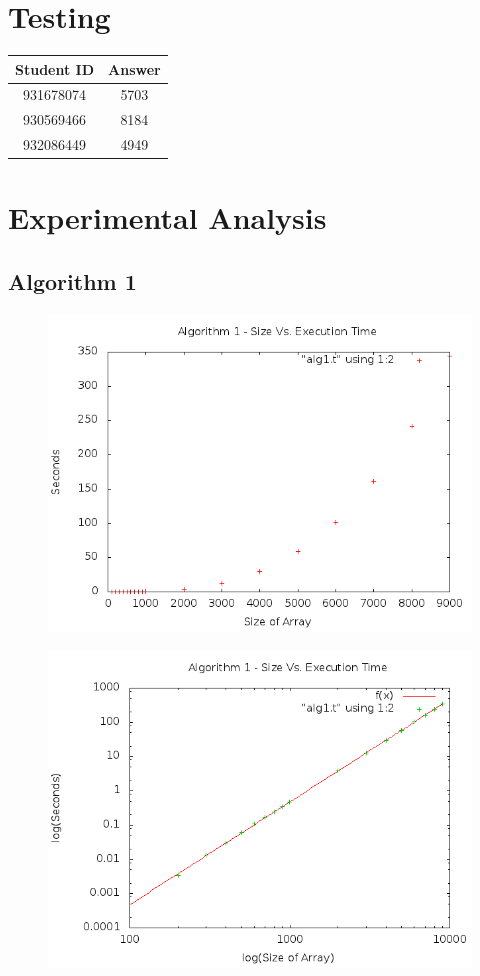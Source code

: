 \documentclass[a4paper,10pt]{article}
\begin{document}
	\section{Testing}

		\begin{tabular}{ | c | c | }
		\hline
		Student ID & Answer\\ \hline
		931678074 & 5703 \\
		930569466 & 8184 \\
		932086449 & 4949 \\
		\hline
		\end{tabular}

	\newpage
	\section{Experimental Analysis}

		\subsection{Algorithm 1}
			\begin{figure}[!htb]
				\centering
				\includegraphics[scale=.5]{timingfiles/alg1plot.png}
			\end{figure}
			\begin{figure}[!htb]
				\centering
				\includegraphics[scale=.5]{timingfiles/alg1plotlog.png}
			\end{figure}
\end{document}
